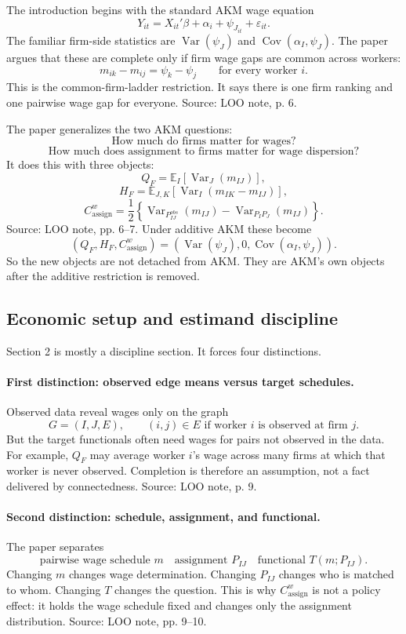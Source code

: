\documentclass[11pt]{article}
\newcommand{\E}{\mathbb{E}}
\newcommand{\Var}{\operatorname{Var}}
\newcommand{\Cov}{\operatorname{Cov}}
\begin{document}
The introduction begins with the standard AKM wage equation
\[
Y_{it}=X_{it}'\beta+\alpha_i+\psi_{J_{it}}+\varepsilon_{it}.
\]
The familiar firm-side statistics are \(\Var(\psi_J)\) and
\(\Cov(\alpha_I,\psi_J)\). The paper argues that these are complete only if
firm wage gaps are common across workers:
\[
m_{ik}-m_{ij}=\psi_k-\psi_j
\qquad\text{for every worker }i.
\]
This is the common-firm-ladder restriction. It says there is one firm ranking
and one pairwise wage gap for everyone. Source: LOO note, p. 6.

The paper generalizes the two AKM questions:
\[
\text{How much do firms matter for wages?}
\]
\[
\text{How much does assignment to firms matter for wage dispersion?}
\]
It does this with three objects:
\[
Q_F=\E_I[\Var_J(m_{IJ})],
\]
\[
H_F=\E_{J,K}[\Var_I(m_{IK}-m_{IJ})],
\]
\[
C^w_{\mathrm{assign}}
=
\frac{1}{2}\left\{\Var_{P^{obs}_{IJ}}(m_{IJ})
-\Var_{P_I P_J}(m_{IJ})\right\}.
\]
Source: LOO note, pp. 6--7. Under additive AKM these become
\[
(Q_F,H_F,C^w_{\mathrm{assign}})
=
(\Var(\psi_J),0,\Cov(\alpha_I,\psi_J)).
\]
So the new objects are not detached from AKM. They are AKM's own objects after
the additive restriction is removed.

\subsection{Economic setup and estimand discipline}

Section 2 is mostly a discipline section. It forces four distinctions.

\paragraph{First distinction: observed edge means versus target schedules.}
Observed data reveal wages only on the graph
\[
G=(I,J,E),
\qquad
(i,j)\in E
\text{ if worker }i\text{ is observed at firm }j.
\]
But the target functionals often need wages for pairs not observed in the data.
For example, \(Q_F\) may average worker \(i\)'s wage across many firms at which
that worker is never observed. Completion is therefore an assumption, not a fact
delivered by connectedness. Source: LOO note, p. 9.

\paragraph{Second distinction: schedule, assignment, and functional.}
The paper separates
\[
\boxed{\text{pairwise wage schedule }m}
\quad
\boxed{\text{assignment }P_{IJ}}
\quad
\boxed{\text{functional }T(m;P_{IJ})}.
\]
Changing \(m\) changes wage determination. Changing \(P_{IJ}\) changes who is
matched to whom. Changing \(T\) changes the question. This is why
\(C^w_{\mathrm{assign}}\) is not a policy effect: it holds the wage schedule
fixed and changes only the assignment distribution. Source: LOO note, pp. 9--10.
\end{document}
